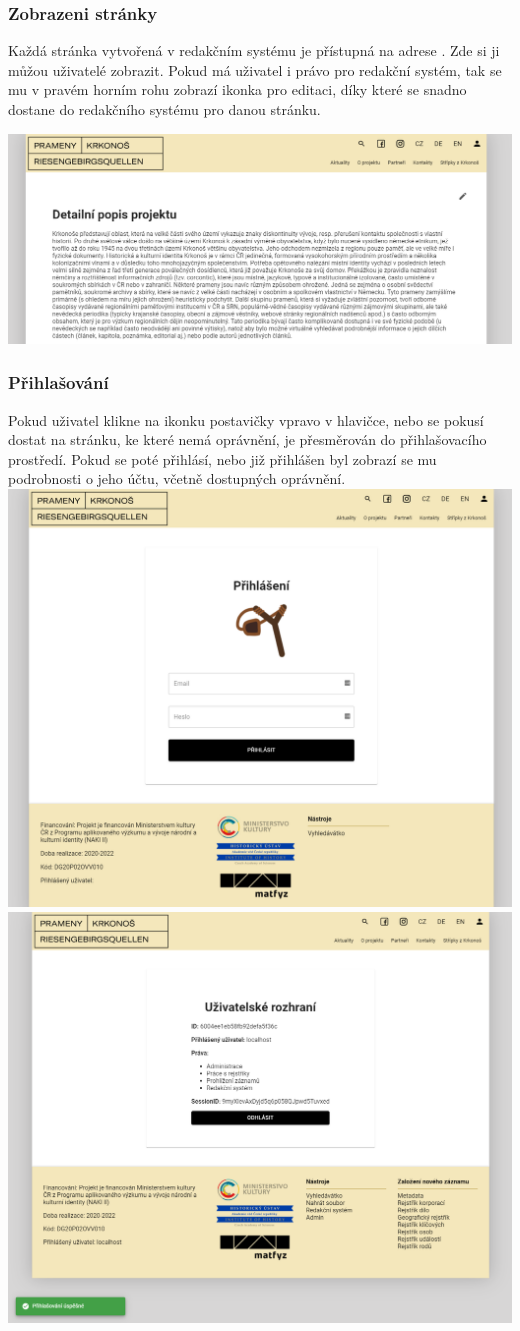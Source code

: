 \subsubsection{Zobrazeni stránky}
Každá stránka vytvořená v redakčním systému je přístupná na adrese .
Zde si ji můžou uživatelé zobrazit. Pokud má uživatel i právo pro redakční systém,
tak se mu v pravém horním rohu zobrazí ikonka pro editaci, díky které se snadno dostane do
redakčního systému pro danou stránku.
\begin{center}
	\includegraphics[width=.8\textwidth]{img/pageScene.png}
\end{center}

\subsubsection{Přihlašování}
Pokud uživatel klikne na ikonku postavičky vpravo v hlavičce, nebo se pokusí dostat
na stránku, ke které nemá oprávnění, je přesměrován do přihlašovacího prostředí.
Pokud se poté přihlásí, nebo již přihlášen byl zobrazí se mu podrobnosti o jeho účtu,
včetně dostupných oprávnění.\\
\includegraphics[width=.5\textwidth]{img/loginSceneB.png}
\includegraphics[width=.5\textwidth]{img/loginSceneA.png}

